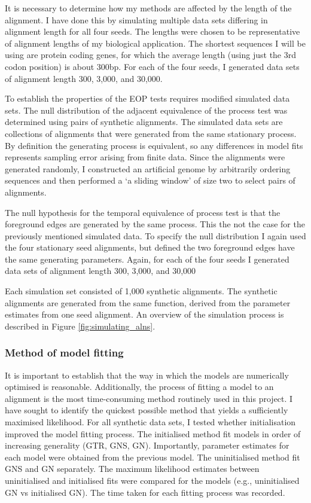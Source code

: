 It is necessary to determine how my methods are affected by the length of the alignment. I have done this by simulating multiple data sets differing in alignment length for all four seeds. The lengths were chosen to be representative of alignment lengths of my biological application. The shortest sequences I will be using are protein coding genes, for which the average length (using just the 3rd codon position) is about 300bp. For each of the four seeds, I generated data sets of alignment length 300, 3,000, and 30,000.   

To establish the properties of the EOP tests requires modified simulated data sets. The null distribution of the adjacent equivalence of the process test was determined using pairs of synthetic alignments. The simulated data sets are collections of alignments that were generated from the same stationary process. By definition the generating process is equivalent, so any differences in model fits represents sampling error arising from finite data. Since the alignments were generated randomly, I constructed an artificial genome by arbitrarily ordering sequences and then performed a `a sliding window' of size two to select pairs of alignments.

The null hypothesis for the temporal equivalence of process test is that the foreground edges are generated by the same process. This the not the case for the previously mentioned simulated data. To specify the null distribution I again used the four stationary seed alignments, but defined the two foreground edges have the same generating parameters. Again, for each of the four seeds I generated data sets of alignment length 300, 3,000, and 30,000

Each simulation set consisted of 1,000 synthetic alignments. The synthetic alignments are generated from the same function, derived from the parameter estimates from one seed alignment. An overview of the simulation process is described in Figure \ref{fig:simulating_alns}.



\subsubsection{Method of model fitting}

It is important to establish that the way in which the models are numerically optimised is reasonable. Additionally, the process of fitting a model to an alignment is the most time-consuming method routinely used in this project. I have sought to identify the quickest possible method that yields a sufficiently maximised likelihood. For all synthetic data sets, I tested whether initialisation improved the model fitting process. The initialised method fit models in order of increasing generality (GTR, GNS, GN). Importantly, parameter estimates for each model were obtained from the previous model. The uninitialised method fit GNS and GN separately. The maximum likelihood estimates between uninitialised and initialised fits were compared for the models (e.g., uninitialised GN vs initialised GN). The time taken for each fitting process was recorded.  


